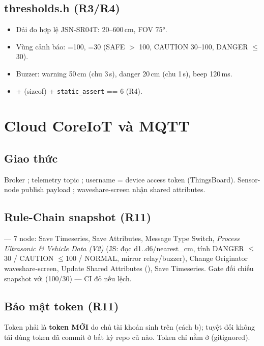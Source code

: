 \subsection{thresholds.h (R3/R4)}
\begin{itemize}
\item Dải đo hợp lệ JSN-SR04T: 20--600\,cm, FOV 75°.
\item Vùng cảnh báo: =100, =30
  (SAFE $>$ 100, CAUTION 30--100, DANGER $\leq$ 30).
\item Buzzer: warning 50\,cm (chu 3\,s), danger 20\,cm (chu 1\,s), beep 120\,ms.
\item {} +  (sizeof) + \verb+static_assert+ == 6 (R4).
\end{itemize}

\section{Cloud CoreIoT và MQTT}
\label{sec:sys-cloud}

\subsection{Giao thức}
Broker ; telemetry topic ;
username = device access token (ThingsBoard). Sensor-node publish payload
; waveshare-screen nhận shared attributes.

\subsection{Rule-Chain snapshot (R11)}
 — 7 node: Save Timeseries,
Save Attributes, Message Type Switch, \emph{Process Ultrasonic \& Vehicle Data (V2)}
(JS: đọc d1..d6/nearest\_cm, tính  DANGER $\leq$30 /
CAUTION $\leq$100 / NORMAL, mirror relay/buzzer), Change Originator waveshare-screen,
Update Shared Attributes (), Save Timeseries. Gate
 đối chiếu snapshot với
 (100/30) — CI đỏ nếu lệch.

\subsection{Bảo mật token (R11)}
Token phải là \textbf{token MỚI} do chủ tài khoản sinh trên
 (cách b); tuyệt đối không tái dùng token đã commit ở bất kỳ repo cũ
nào. Token chỉ nằm ở  (gitignored).

